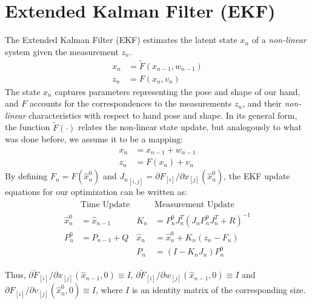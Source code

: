 \section{Extended Kalman Filter (EKF)}
The Extended Kalman Filter (EKF) estimates the latent state $x_n$ of a \emph{non-linear} system given the measurement $z_n$.
% 
\begin{align}
x_n &= \tilde{F}(x_{n - 1},  w_{n - 1}) \\
z_n &= F(x_n, v_n)
\end{align}
% 
The state $x_n$ captures parameters representing the pose and shape of our hand, and $F$ accounts for the correspondences to the measurements $z_n$, and their \emph{non-linear} characteristics with respect to hand pose and shape. In its general form, the function $\tilde{F}(\cdot)$ relates the non-linear state update, but analogously to what was done before, we assume it to be a   mapping:
% 
\begin{align}
x_n &= x_{n - 1} + w_{n - 1} \\
z_n &= F(x_n) + v_n 
\end{align}
%
By defining $F_n = F(\hat{x}_n^0)$ and ${J_n}_{[i, j]} = \partial F_{[i]} / \partial x_{[j]}(\hat{x}_n^0)$, the EKF update equations for our optimization can be written as:
% 
\begin{gather}
\begin{aligned}
&\text{Time Update}                 &       &\text{Measurement Update} \\
\hat{x}_n^0 &=\hat{x}_{n-1}           &       K_n &= P_n^0 J_n^T(J_n P_n^0 J_n^T + R)^{-1}\\
P_n^0 &= P_{n-1} + Q                 &       \hat{x}_n &= \hat{x}_n^0 + K_n(z_n - F_n) \\
&                                   &       P_n &= (I - K_n J_n)P_n^0
\end{aligned}
\label{eq:extended}
\end{gather}
% 
\begin{DRAFT}
Thus, ${ \partial \tilde{F}_{[i]}}/{ \partial x_{[j]}}(\hat{x}_{n - 1}, 0) \equiv I$, ${ \partial \tilde{F}_{[i]}}/{ \partial w_{[j]}}(\hat{x}_{n - 1}, 0) \equiv I$ and ${ \partial F_{[i]}}/{ \partial v_{[j]}}(\hat{x}_n^0, 0) \equiv I$, where $I$ is an identity matrix of the corresponding size.    
\end{DRAFT}





 
